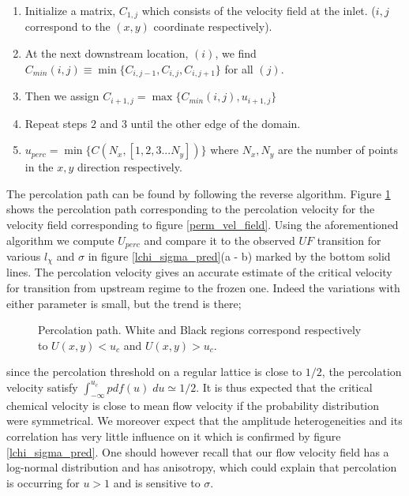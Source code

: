 \documentclass[doublecol]{epl2}
\def\figdir{./}
\begin{document}
\begin{enumerate}
 \item Initialize a matrix, $C_{1,j}$ which consists of the velocity field at the inlet. ($i,j$ correspond to the $(x,y)$ coordinate respectively).
 \item At the next downstream location, $(i)$, we find $C_{min}(i,j) \equiv \min\{C_{i,j-1},C_{i,j},C_{i,j+1}\}$ for all $(j)$.
 \item Then we assign $C_{i+1,j} = \max\{C_{min}(i,j) , u_{i+1,j}\}$
 \item Repeat steps $2$ and $3$ until the other edge of the domain.
 \item $u_{perc} = \min \{C(N_x,[1,2,3...N_y])\}$ where $N_x, N_y$ are the number of points in the $x,y$ direction respectively.
\end{enumerate}
The percolation path can be found by following the reverse algorithm.
Figure \ref{perc_path} shows the percolation path corresponding to the percolation velocity for the velocity field corresponding to figure \ref{perm_vel_field}. Using the aforementioned algorithm we compute $U_{perc}$ and compare it to the observed $UF$ transition for various $l_\chi$ and $\sigma$ in figure \ref{lchi_sigma_pred}(a - b) marked by the bottom solid lines. The percolation velocity gives an accurate estimate of the critical velocity for transition from upstream regime to the frozen one. Indeed the variations with either parameter is small, but the trend is there;
\begin{figure}
 \onefigure[width=0.99\hsize]{\figdir/percolation_path_casenum_1289}
 \caption{\label{perc_path}Percolation path. White and Black regions correspond respectively to $U(x,y)<u_c$ and $U(x,y)>u_c$.}
\end{figure}
since the percolation threshold on a regular lattice is close to $1/2$, the percolation velocity satisfy $\int_{-\infty}^{u_c} pdf(u)\;du \simeq 1/2$.
It is thus expected that the critical chemical velocity is close to mean flow velocity if the probability distribution  were symmetrical.
We moreover expect that the amplitude heterogeneities and its correlation has very little influence on it which is confirmed by figure \ref{lchi_sigma_pred}.
One should however recall that our flow  velocity field has a log-normal distribution and has anisotropy, which could explain that percolation is occurring for $u>1$ and is sensitive to $\sigma$.
\end{document}
